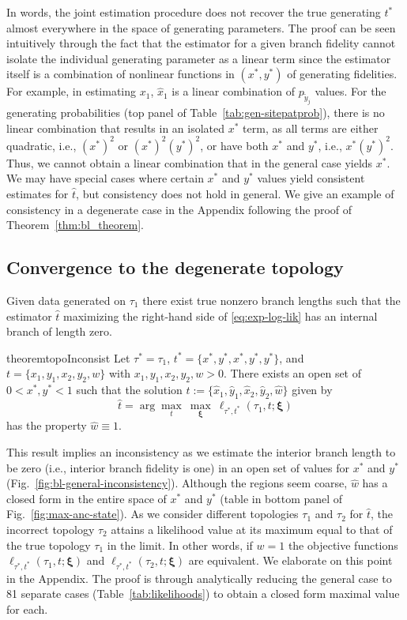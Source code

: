 \documentclass[11pt]{article}
\newcommand{\siteSplit}{\tilde{y}}
\begin{document}
In words, the joint estimation procedure does not recover the true generating $t^*$ almost everywhere in the space of generating parameters.
The proof can be seen intuitively through the fact that the estimator for a given branch fidelity cannot isolate the individual generating parameter as a linear term since the estimator itself is a combination of nonlinear functions in $(x^*,y^*)$ of generating fidelities.
For example, in estimating $x_1$, $\hat{x}_1$ is a linear combination of $p_{\siteSplit_j}$ values.
For the generating probabilities (top panel of Table~\ref{tab:gen-sitepatprob}), there is no linear combination that results in an isolated $x^*$ term, as all terms are either quadratic, i.e., $(x^*)^2$ or $(x^*)^2(y^*)^2$, or have both $x^*$ and $y^*$, i.e., $x^*(y^*)^2$.
Thus, we cannot obtain a linear combination that in the general case yields $x^*$.
We may have special cases where certain $x^*$ and $y^*$ values yield consistent estimates for $\hat{t}$, but consistency does not hold in general.
We give an example of consistency in a degenerate case in the Appendix following the proof of Theorem~\ref{thm:bl_theorem}.

\subsection*{Convergence to the degenerate topology}
Given data generated on $\tau_1$ there exist true nonzero branch lengths such that the estimator $\hat{t}$ maximizing the right-hand side of \eqref{eq:exp-log-lik} has an internal branch of length zero.
\begin{restatable}{theorem}{topoInconsist}
\label{thm:topo_theorem}
Let $\tau^*=\tau_1$, $t^*=\{x^*, y^*, x^*, y^*, y^*\}$, and $t=\{x_1, y_1, x_2, y_2, w\}$ with $x_1, y_1, x_2, y_2, w > 0$.
There exists an open set of $0 < x^*, y^* < 1$ such that the solution $\hat{t} := \{\hat{x}_1,\hat{y}_1,\hat{x}_2,\hat{y}_2,\hat{w}\}$ given by
\[
\hat{t} = \arg\max_{t} \ \max_{\boldsymbol\xi} \ \ell_{\tau^*,t^*}(\tau_1, t; \boldsymbol\xi)
\]
has the property $\hat{w}\equiv 1$.
\end{restatable}

This result implies an inconsistency as we estimate the interior branch length to be zero (i.e., interior branch fidelity is one) in an open set of values for $x^*$ and $y^*$ (Fig.~\ref{fig:bl-general-inconsistency}).
Although the regions seem coarse, $\hat{w}$ has a closed form in the entire space of $x^*$ and $y^*$ (table in bottom panel of Fig.~\ref{fig:max-anc-state}).
As we consider different topologies $\tau_1$ and $\tau_2$ for $\hat{t}$, the incorrect topology $\tau_2$ attains a likelihood value at its maximum equal to that of the true topology $\tau_1$ in the limit.
In other words, if $w=1$ the objective functions $\ell_{\tau^*,t^*}(\tau_1, t; \boldsymbol\xi)$ and $\ell_{\tau^*,t^*}(\tau_2, t; \boldsymbol\xi)$ are equivalent.
We elaborate on this point in the Appendix.
The proof is through analytically reducing the general case to 81 separate cases (Table~\ref{tab:likelihoods}) to obtain a closed form maximal value for each.
\end{document}
